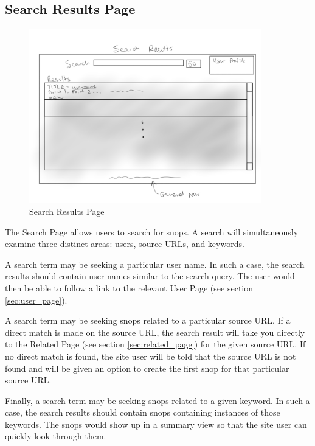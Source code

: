 \documentclass[11pt]{article}
\begin{document}
\subsection{Search Results Page}
\label{sec:search_results_page}
\begin{figure}[htb]
\begin{center}
\includegraphics[width=0.9\textwidth]{search_results.png}
\caption{Search Results Page}
\label{fig:fig_search_results_page}
\end{center}
\end{figure}
The Search Page allows users to search for snops. A search will simultaneously examine three distinct areas: users, source URLs, and keywords.

A search term may be seeking a particular user name. In such a case, the search results should contain user names similar to the search query. The user would then be able to follow a link to the relevant User Page (see section \ref{sec:user_page}).

A search term may be seeking snops related to a particular source URL. If a direct match is made on the source URL, the search result will take you directly to the Related Page (see section \ref{sec:related_page}) for the given source URL. If no direct match is found, the site user will be told that the source URL is not found and will be given an option to create the first snop for that particular source URL.

Finally, a search term may be seeking snops related to a given keyword. In such a case, the search results should contain snops containing instances of those keywords. The snops would show up in a summary view so that the site user can quickly look through them.
\end{document}
